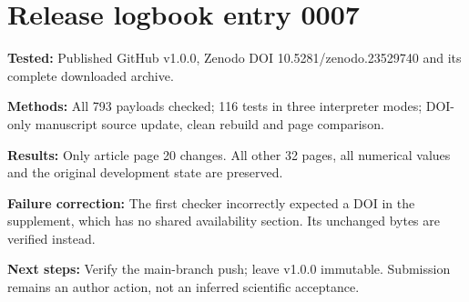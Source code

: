 \section*{Release logbook entry 0007}
\textbf{Tested:} Published GitHub v1.0.0, Zenodo DOI 10.5281/zenodo.23529740 and its complete downloaded archive.

\textbf{Methods:} All 793 payloads checked; 116 tests in three interpreter modes; DOI-only manuscript source update, clean rebuild and page comparison.

\textbf{Results:} Only article page 20 changes. All other 32 pages, all numerical values and the original development state are preserved.

\textbf{Failure correction:} The first checker incorrectly expected a DOI in the supplement, which has no shared availability section. Its unchanged bytes are verified instead.

\textbf{Next steps:} Verify the main-branch push; leave v1.0.0 immutable. Submission remains an author action, not an inferred scientific acceptance.
